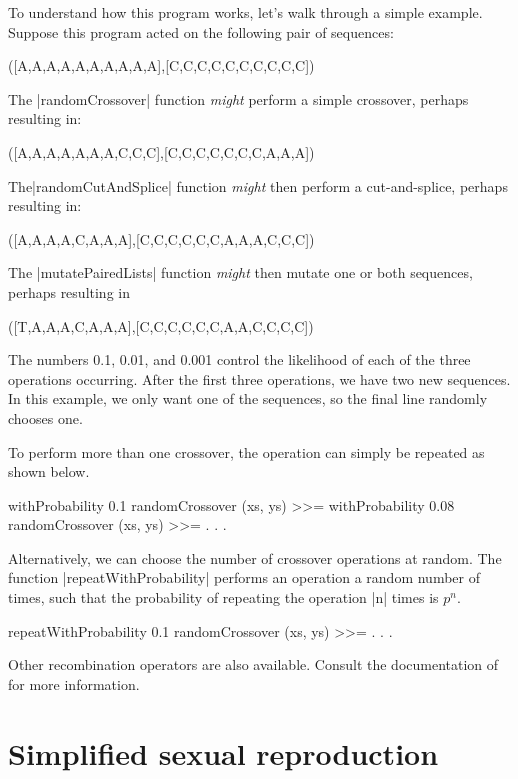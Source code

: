 \documentclass[a4paper,10pt]{report}
\begin{document}
To understand how this program works,
let's walk through a simple example.
Suppose this program acted on the following pair of sequences:
\begin{code}
([A,A,A,A,A,A,A,A,A,A],[C,C,C,C,C,C,C,C,C,C])
\end{code} 
The |randomCrossover| function \emph{might} perform a simple crossover,
perhaps resulting in:
\begin{code}
([A,A,A,A,A,A,A,C,C,C],[C,C,C,C,C,C,C,A,A,A])
\end{code} 
The|randomCutAndSplice| function \emph{might} then perform a cut-and-splice, perhaps
resulting in:
\begin{code}
([A,A,A,A,C,A,A,A],[C,C,C,C,C,C,A,A,A,C,C,C])
\end{code} 
The |mutatePairedLists| function \emph{might} then mutate one or both sequences, perhaps
resulting in
\begin{code}
([T,A,A,A,C,A,A,A],[C,C,C,C,C,C,A,A,C,C,C,C])
\end{code} 
The numbers 0.1, 0.01, and 0.001 control the likelihood of each
of the three operations occurring.
After the first three operations, we have two new sequences.
In this example, we only want one of the sequences,
so the final line randomly chooses one.

To perform more than one crossover, the operation can simply be repeated
as shown below.

\begin{code}
    withProbability 0.1 randomCrossover (xs, ys) >>=
    withProbability 0.08 randomCrossover (xs, ys) >>=
    . . .
\end{code} 

Alternatively, we can choose the number of crossover operations at 
random. The function |repeatWithProbability| performs an operation a
random number of times, such that the probability of repeating the
operation |n| times is $p^n$.

\begin{code}
    repeatWithProbability 0.1 randomCrossover (xs, ys) >>=
    . . .
\end{code} 

Other recombination operators are also available.
Consult the documentation of 
for more information.

\chapter{Simplified sexual reproduction}
\label{sec:plant}
\end{document}
